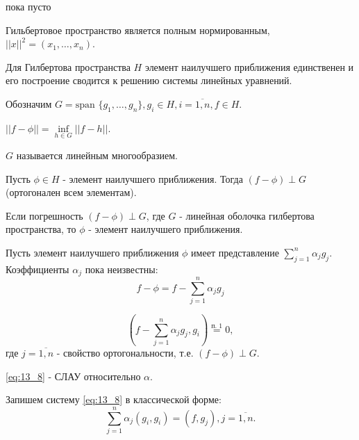 \begin{col-answer-preambule}
	\begin{plan}
    \item пока пусто
	\end{plan}
\end{col-answer-preambule}


Гильбертовое пространство является полным нормированным, $||x||^2 = (x_1, \ldots, x_n)$.

Для Гилбертова пространства $H$ элемент наилучшего приближения единственен и его построение сводится к решению системы линейных уравнений.

Обозначим $G = \text{span } \{ g_1, \ldots, g_n \}, g_i \in H, i = \overline{1, n}, f \in H$.

$|| f - \phi || = \inf\limits_{h \in G} || f - h||$.

$G$ называется линейным многообразием.

\begin{lemma}
  Пусть $\phi \in H$ - элемент наилучшего приближения. Тогда $(f - \phi) \perp G$ (ортогонален всем элементам).
\end{lemma}

\begin{lemma}
  Если погрешность $(f - \phi) \perp G$, где $G$ - линейная оболочка гилбертова пространства, то $\phi$ - элемент наилучшего приближения.
\end{lemma}

Пусть элемент наилучшего приближения $\phi$ имеет представление $\sum\limits_{j=1}^n \alpha_j g_{j}$. Коэффициенты $\alpha_j$ пока неизвестны:
\begin{equation*}
  f - \phi = f - \sum\limits_{j=1}^n \alpha_j g_{j}
\end{equation*}

\begin{equation}\label{eq:13_8}
  \left(f - \sum\limits_{j=1}^n \alpha_j g_{j}, g_i \right) \overset{\text{п. 1}}{=} 0,
\end{equation}
где $j = \overline{1, n}$ - свойство ортогональности, т.е. $(f - \phi) \perp G$.

\eqref{eq:13_8} - СЛАУ относительно $\alpha$.

Запишем систему \eqref{eq:13_8} в классической форме:
\begin{equation}\label{eq:13_9}
  \sum\limits_{j=1}^n \alpha_j (g_i, g_i) = (f, g_j), j = \overline{1, n}.
\end{equation}

